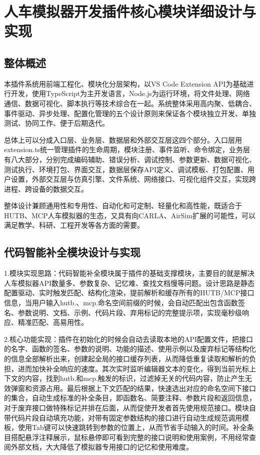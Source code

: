 
\chapter{人车模拟器开发插件核心模块详细设计与实现}

\section{整体概述}

本插件系统用前端工程化、模块化分层架构，以VS Code Extension
API为基础进行开发，使用TypeScript为主开发语言，Node.js为运行环境，将文件处理、网络通信、数据可视化、脚本执行等技术综合在一起。系统整体采用高内聚、低耦合、事件驱动、异步处理、配置化管理的五个设计原则来保证各个模块独立开发、单独测试、协同工作、便于后期迭代。

总体上可以分成入口层、业务层、数据层和外部交互层这四个部分。入口层用extension.ts统一管理插件的生命周期，模块注册、事件监听、命令绑定，业务层有八大部分，分别完成编码辅助、错误分析、调试控制、参数更新、数据可视化、测试执行、环境打包、界面交互，数据层保存API定义、调试模板、打包配置、用户设置，外部交互层与仿真引擎、文件系统、网络接口、可视化组件交互，实现跨进程、跨设备的数据交互。

整体设计兼顾通用性和专用性、自动化和可定制、轻量化和高性能，既适合于HUTB、MCP人车模拟器的生态，又具有向CARLA、AirSim扩展的可能性，可以满足教学、科研、工程开发等各方面的需要。

\section{代码智能补全模块设计与实现}

1.模块实现思路：代码智能补全模块属于插件的基础支撑模块，主要目的就是解决人车模拟器API数量多、参数复杂、记忆难、查找文档慢等问题。设计思路是静态配置驱动、实时触发匹配、结构化渲染，提前解析和缓存所有的HUTB/MCP接口信息，当用户输入hutb.、mcp.命名空间前缀的时候，会自动匹配出包含函数签名、参数说明、文档、示例、代码片段、弃用标记的完整提示项，实现毫秒级响应、精准匹配、高易用性。

2.核心功能实现：插件在初始化的时候会自动去读取本地的API配置文件，把接口的名字、函数的签名、参数的说明、功能的描述、使用示例以及废弃标记等结构化的信息全部解析出来，创建起全局的接口缓存列表，从而降低重复读取和解析的负担，进而加快补全响应的速度。其次实时监听编辑器文本的变化，得到当前光标上下文的内容，找到hutb.和mcp.触发的标识，过滤掉无关的代码内容，防止产生无效弹窗和资源占用。最后根据上下文匹配的结果，快速选出对应的命名空间下接口的集合，自动生成标准的补全条目，即函数名、简要注释、参数片段和返回信息，对于废弃接口做特殊标记并排在后面，从而促使开发者首先使用规范接口。模块自带代码片段自动填充功能，对带有固定参数结构的接口进行自动生成规范调用模板，使用Tab键可以快速跳转到参数的位置上，从而节省手动输入的时间。补全条目搭配悬浮注释展示，鼠标悬停即可看到完整的接口说明和使用案例，不用经常查阅外部文档，大大降低了模拟器专用接口的记忆和使用难度。

